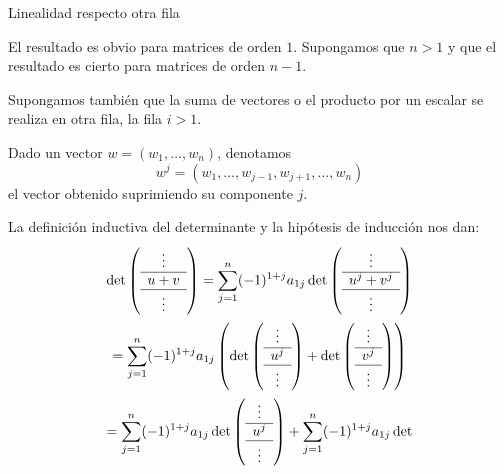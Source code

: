 \begin{frame}[allowframebreaks, t]{Linealidad respecto otra fila}

El resultado es obvio para matrices de orden \(1\). Supongamos que \(n>1\) y que el resultado es cierto para matrices de orden \(n-1\).

\medskip

Supongamos también que la suma de vectores o el producto por un escalar se realiza en otra fila, la fila \(i>1\). 

\medskip

Dado un vector $w=(w_1,\ldots,w_n)$, denotamos 
\[w^j=(w_1,\ldots,w_{j-1},w_{j+1},\ldots,w_n)\]
el vector obtenido suprimiendo su componente \(j\). 

\framebreak

La definición inductiva del determinante y la hipótesis de inducción nos dan:
\begin{multline*}
\det
\left(
\begin{array}{c}
\vdots\\
\hline
u+v\\
\hline
\vdots
\end{array}
\right)
=
\sum_{j=1}^n
(-1)^{1+j}a_{1j}\det
\left(
\begin{array}{c}
\vdots\\
\hline\\[-12pt]
u^j+v^j\\
\hline
\vdots
\end{array}
\right)\\
=
\sum_{j=1}^n
(-1)^{1+j}a_{1j}\left(\det
\left(
\begin{array}{c}
\vdots\\
\hline\\[-12pt]
u^j\\
\hline
\vdots
\end{array}
\right)
+
\det
\left(
\begin{array}{c}
\vdots\\
\hline\\[-12pt]
v^j\\
\hline
\vdots
\end{array}
\right)\right)
\\
=
\sum_{j=1}^n
(-1)^{1+j}a_{1j}\det
\left(
\begin{array}{c}
\vdots\\
\hline\\[-12pt]
u^j\\
\hline
\vdots
\end{array}
\right)
+
\sum_{j=1}^n
(-1)^{1+j}a_{1j}\det

\end{multline*}
\end{frame}
